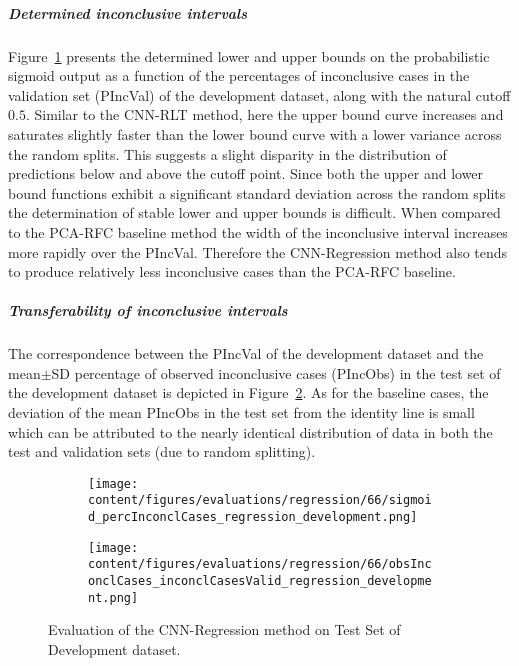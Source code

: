 \subparagraph{Determined inconclusive intervals}

Figure~\ref{fig:regression_percInconclCases_development} presents the determined lower and upper bounds on the 
probabilistic sigmoid output as a function of the percentages of inconclusive cases 
in the validation set (PIncVal) of the development dataset, along with the natural cutoff $0.5$.
Similar to the CNN-RLT method, 
here the upper bound curve increases and saturates slightly faster than the lower bound curve with a lower variance across 
the random splits.
This suggests a slight disparity in the distribution of predictions below and above the cutoff point.
Since both the upper and lower bound functions exhibit a significant standard deviation across the random splits 
the determination of stable lower and upper bounds is difficult.
When compared to the PCA-RFC baseline method 
the width of the inconclusive interval increases more rapidly over the PIncVal.
Therefore the CNN-Regression method also tends to produce relatively less inconclusive cases than the PCA-RFC baseline.


\subparagraph{Transferability of inconclusive intervals}

The correspondence between the PIncVal of the development dataset 
and the mean$\pm$SD percentage of observed inconclusive cases (PIncObs) in the test set of the development dataset 
is depicted in Figure~\ref{fig:obsInconclCases_inconclCasesValid_regression_development}.
As for the baseline cases, the deviation of the mean PIncObs in the test set from the 
identity line is small which can be attributed to the nearly identical distribution of data in both the test and validation sets 
(due to random splitting).


\begin{figure}[ht]
  \begin{subfigure}{0.48\textwidth}
    \centering
    \texttt{[image: content/figures/evaluations/regression/66/sigmoid\_percInconclCases\_regression\_development.png]}
    \label{fig:regression_percInconclCases_development}
  \end{subfigure}
  \hfill
  \begin{subfigure}{0.495\textwidth}
    \centering
    \texttt{[image: content/figures/evaluations/regression/66/obsInconclCases\_inconclCasesValid\_regression\_development.png]}
    \label{fig:obsInconclCases_inconclCasesValid_regression_development}
  \end{subfigure}

  \caption{Evaluation of the CNN-Regression method on Test Set of Development dataset.}
  \label{fig:eval_cnn_regression_dev}
\end{figure}


